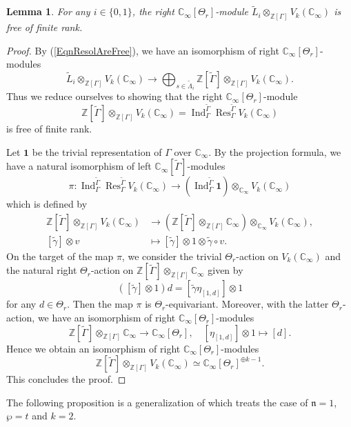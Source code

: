\documentclass[11pt]{amsart}
\theoremstyle{plain}
\newtheorem{lem}[thm]{Lemma}
\theoremstyle{definition}
\DeclareMathOperator{\Ind}{Ind}
\DeclareMathOperator{\Res}{Res}
\newcommand{\bZ}{\mathbb{Z}}
\newcommand{\frn}{\mathfrak{n}}
\newcommand{\Cinf}{\mathbb{C}_{\infty}}
\begin{document}
\begin{lem}\label{LemThetaFreeOfResolution}
	For any $i\in\{0,1\}$, the right $\Cinf[\Theta_r]$-module $\tilde{L}_i\otimes_{\bZ[\Gamma]}V_k(\Cinf)$ is free of finite rank.
\end{lem}
\begin{proof}
	By (\ref{EqnResolAreFree}), we have an isomorphism of right $\Cinf[\Theta_r]$-modules
	\[
	\tilde{L}_i\otimes_{\bZ[\Gamma]}V_k(\Cinf)\to \bigoplus_{s\in \tilde{\Lambda}_{i}} \bZ[\tilde{\Gamma}]\otimes_{\bZ[\Gamma]}V_k(\Cinf).
	\]
	Thus we reduce ourselves to showing that the right $\Cinf[\Theta_r]$-module
	\[
	 \bZ[\tilde{\Gamma}]\otimes_{\bZ[\Gamma]}V_k(\Cinf)=\Ind_{\Gamma}^{\tilde{\Gamma}}\Res_{\Gamma}^{\tilde{\Gamma}}V_k(\Cinf)
	\]
	is free of finite rank.
	
	Let $\mathbf{1}$ be the trivial representation of $\Gamma$ over $\Cinf$. By the projection formula, we have a natural isomorphism of left $\Cinf[\tilde{\Gamma}]$-modules
	\[
	\pi:\Ind_{\Gamma}^{\tilde{\Gamma}}\Res_{\Gamma}^{\tilde{\Gamma}}V_k(\Cinf)\to (\Ind_{\Gamma}^{\tilde{\Gamma}}\mathbf{1})\otimes_{\Cinf} V_k(\Cinf)
	\]
	which is defined by
	\[
	\begin{aligned}
	 \bZ[\tilde{\Gamma}]\otimes_{\bZ[\Gamma]}V_k(\Cinf)&\to  (\bZ[\tilde{\Gamma}]\otimes_{\bZ[\Gamma]}\Cinf)\otimes_{\Cinf} V_k(\Cinf),\\
	 [\tilde{\gamma}]\otimes v&\mapsto [\tilde{\gamma}]\otimes 1 \otimes \tilde{\gamma}\circ v.
	 \end{aligned}
	\]
	On the target of the map $\pi$, we consider the trivial $\Theta_r$-action on $V_k(\Cinf)$ and
	the natural right $\Theta_r$-action on $\bZ[\tilde{\Gamma}]\otimes_{\bZ[\Gamma]}\Cinf$ given by
	\[
	([\tilde{\gamma}]\otimes 1)d=[\tilde{\gamma}\eta_{[1,d]}]\otimes 1
	\]
	for any $d\in \Theta_r$.
	Then the map $\pi$ is $\Theta_r$-equivariant. Moreover, with the latter $\Theta_r$-action, 
	we have an isomorphism of right $\Cinf[\Theta_r]$-modules
	\[
	\bZ[\tilde{\Gamma}]\otimes_{\bZ[\Gamma]}\Cinf\to \Cinf[\Theta_r],\quad [\eta_{[1,d]}]\otimes 1\mapsto [d].
	\]
	Hence we obtain an isomorphism of right $\Cinf[\Theta_r]$-modules
	\[
	\bZ[\tilde{\Gamma}]\otimes_{\bZ[\Gamma]}V_k(\Cinf)\simeq \Cinf[\Theta_r]^{\oplus k-1}.
	\]
	This concludes the proof.
\end{proof}





The following proposition is a generalization of \cite[Proposition 4.8]{Ha_DMO} which treats the case of $\frn=1$, $\wp=t$ and $k=2$.
\end{document}
